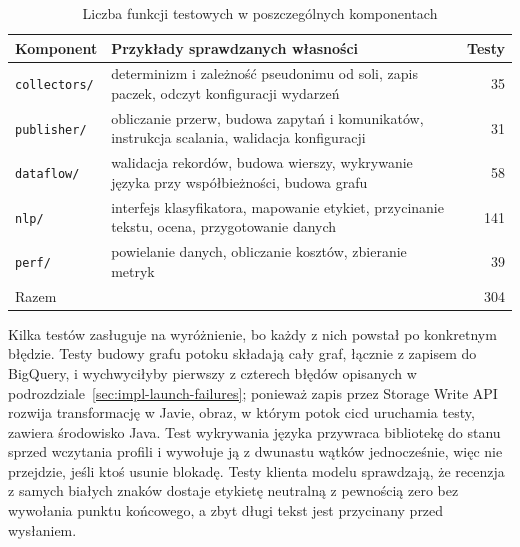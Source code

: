 \begin{table}[hbp]
  \caption{Liczba funkcji testowych w poszczególnych komponentach}
  \label{tab:test-counts}
  \centering
  \small
  \begin{tabular}{|l|p{}|r|}
    \hline
    Komponent                    & Przykłady sprawdzanych własności                                                           & Testy      \\
    \hline
    \texttt{collectors/}         & determinizm i zależność pseudonimu od soli, zapis paczek, odczyt konfiguracji wydarzeń      & \num{35}   \\
    \hline
    \texttt{publisher/}          & obliczanie przerw, budowa zapytań i komunikatów, instrukcja scalania, walidacja konfiguracji & \num{31}   \\
    \hline
    \texttt{dataflow/}           & walidacja rekordów, budowa wierszy, wykrywanie języka przy współbieżności, budowa grafu      & \num{58}   \\
    \hline
    \texttt{nlp/}                & interfejs klasyfikatora, mapowanie etykiet, przycinanie tekstu, ocena, przygotowanie danych & \num{141}  \\
    \hline
    \texttt{perf/}               & powielanie danych, obliczanie kosztów, zbieranie metryk                                     & \num{39}   \\
    \hline
    \multicolumn{2}{|l|}{Razem}                                                                                                & \num{304}  \\
    \hline
  \end{tabular}
\end{table}

Kilka testów zasługuje na wyróżnienie, bo każdy z nich powstał po konkretnym błędzie.
Testy budowy grafu potoku składają cały graf, łącznie z zapisem do BigQuery, i wychwyciłyby pierwszy z czterech błędów opisanych w podrozdziale~\ref{sec:impl-launch-failures}; ponieważ zapis przez Storage Write API rozwija transformację w Javie, obraz, w którym potok \ac{cicd} uruchamia testy, zawiera środowisko Java.
Test wykrywania języka przywraca bibliotekę  do stanu sprzed wczytania profili i wywołuje ją z dwunastu wątków jednocześnie, więc nie przejdzie, jeśli ktoś usunie blokadę.
Testy klienta modelu sprawdzają, że recenzja z samych białych znaków dostaje etykietę neutralną z pewnością zero bez wywołania punktu końcowego, a zbyt długi tekst jest przycinany przed wysłaniem.

